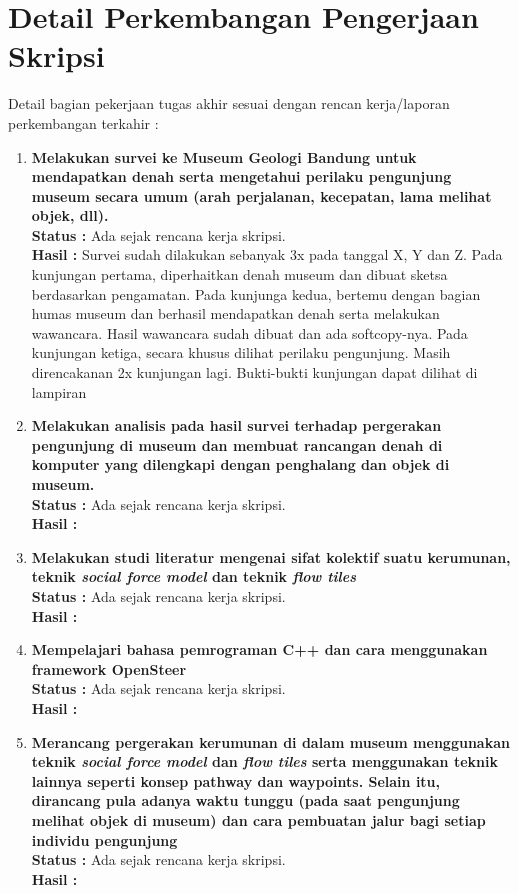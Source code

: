 \documentclass[a4paper,twoside]{article}
\begin{document}
\section{Detail Perkembangan Pengerjaan Skripsi}
Detail bagian pekerjaan tugas akhir sesuai dengan rencan kerja/laporan perkembangan terkahir :
\begin{enumerate}
	\item \textbf{Melakukan survei ke Museum Geologi Bandung untuk mendapatkan denah serta mengetahui perilaku pengunjung museum secara umum (arah perjalanan, kecepatan, lama melihat objek, dll).}\\
	      {\bf Status :} Ada sejak rencana kerja skripsi.\\
	      {\bf Hasil :} Survei sudah dilakukan sebanyak 3x pada tanggal X, Y dan Z. Pada kunjungan pertama, diperhaitkan denah museum dan dibuat sketsa berdasarkan pengamatan. Pada kunjunga kedua, bertemu dengan bagian humas museum dan berhasil mendapatkan denah serta melakukan wawancara. Hasil wawancara sudah dibuat dan ada softcopy-nya. Pada kunjungan ketiga, secara khusus dilihat perilaku pengunjung. Masih direncakanan 2x kunjungan lagi. Bukti-bukti kunjungan dapat dilihat di lampiran

	\item \textbf{Melakukan analisis pada hasil survei terhadap pergerakan pengunjung di museum dan membuat rancangan denah di komputer yang dilengkapi dengan penghalang dan objek di museum.}\\
	      {\bf Status :} Ada sejak rencana kerja skripsi.\\
	      {\bf Hasil :}

	\item \textbf{Melakukan studi literatur mengenai sifat kolektif suatu kerumunan, teknik {\it social force model} dan teknik {\it flow tiles}}\\
	      {\bf Status :} Ada sejak rencana kerja skripsi.\\
	      {\bf Hasil :}

	\item \textbf{Mempelajari bahasa pemrograman C++ dan cara menggunakan framework OpenSteer}\\
	      {\bf Status :} Ada sejak rencana kerja skripsi.\\
	      {\bf Hasil :}

	\item \textbf{Merancang pergerakan kerumunan di dalam museum menggunakan teknik {\it social force model} dan {\it flow tiles} serta menggunakan teknik lainnya seperti konsep pathway dan waypoints. Selain itu, dirancang pula adanya waktu tunggu (pada saat pengunjung melihat objek di museum) dan cara pembuatan jalur bagi setiap individu pengunjung}\\
	      {\bf Status :} Ada sejak rencana kerja skripsi.\\
	      {\bf Hasil :}


\end{enumerate}
\end{document}

